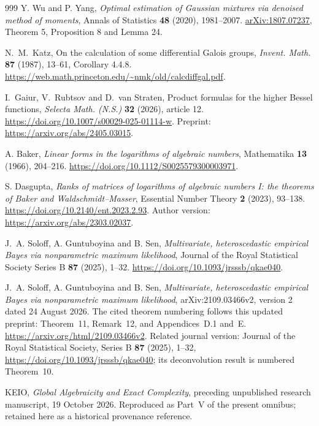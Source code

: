 \documentclass[11pt,a4paper]{article}
\theoremstyle{definition}
\theoremstyle{remark}
\numberwithin{equation}{section}
\begin{document}
\begin{thebibliography}{999}
Y. Wu and P. Yang,
\emph{Optimal estimation of Gaussian mixtures via denoised method of moments},
Annals of Statistics \textbf{48} (2020), 1981--2007.
\href{https://arxiv.org/pdf/1807.07237}{arXiv:1807.07237},
Theorem 5, Proposition 8 and Lemma 24.

N.~M.~Katz, On the calculation of some differential Galois groups,
\emph{Invent. Math.} \textbf{87} (1987), 13--61, Corollary 4.4.8.
\url{https://web.math.princeton.edu/~nmk/old/calcdiffgal.pdf}.

I.~Gaiur, V.~Rubtsov and D.~van Straten, Product formulas for the
higher Bessel functions, \emph{Selecta Math. (N.S.)} \textbf{32}
(2026), article 12. \url{https://doi.org/10.1007/s00029-025-01114-w}.
Preprint: \url{https://arxiv.org/abs/2405.03015}.

A. Baker,
\emph{Linear forms in the logarithms of algebraic numbers},
Mathematika \textbf{13} (1966), 204--216.
\url{https://doi.org/10.1112/S0025579300003971}.

S. Dasgupta,
\emph{Ranks of matrices of logarithms of algebraic numbers I:
the theorems of Baker and Waldschmidt--Masser},
Essential Number Theory \textbf{2} (2023), 93--138.
\url{https://doi.org/10.2140/ent.2023.2.93}.
Author version: \url{https://arxiv.org/abs/2303.02037}.

J.~A. Soloff, A. Guntuboyina and B. Sen,
\emph{Multivariate, heteroscedastic empirical Bayes via nonparametric
maximum likelihood},
Journal of the Royal Statistical Society Series B \textbf{87} (2025),
1--32. \url{https://doi.org/10.1093/jrsssb/qkae040}.

J.~A. Soloff, A. Guntuboyina and B. Sen, \emph{Multivariate, heteroscedastic empirical Bayes via nonparametric maximum likelihood}, arXiv:2109.03466v2, version 2 dated 24 August 2026. The cited theorem numbering follows this updated preprint: Theorem~11, Remark~12, and Appendices~D.1 and~E. \url{https://arxiv.org/html/2109.03466v2}. Related journal version: Journal of the Royal Statistical Society, Series B \textbf{87} (2025), 1--32, \url{https://doi.org/10.1093/jrsssb/qkae040}; its deconvolution result is numbered Theorem~10.

KEIO, \emph{Global Algebraicity and Exact Complexity}, preceding
unpublished research manuscript, 19 October 2026.
Reproduced as Part~V of the present omnibus; retained here as a historical provenance reference.


\end{thebibliography}
\end{document}
